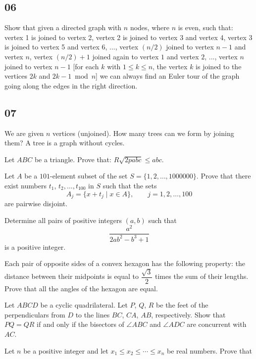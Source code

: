 \newpage
\subsection{06}
Show that given a directed graph with $n$ nodes, where $n$ is even, such that:
vertex 1 is joined to vertex 2, vertex 2 is joined to vertex 3 and vertex 4, vertex 3 is joined to vertex 5 and vertex 6, ..., vertex $(n/2)$ joined to vertex $n-1$ and vertex $n$, vertex $(n/2) +1$ joined again to vertex $1$ and vertex $2$, ..., vertex $n$ joined to vertex $n-1$
[for each $k$ with $1 \leq k \leq n$, the vertex $k$ is joined to the vertices $2k$ and $2k-1 \bmod n$]
we can always find an Euler tour of the graph going along the edges in the right direction.
\eq

\newpage
\subsection{07}
\bq{}{}
We are given $n$ vertices (unjoined). How many trees can we form by joining them? A tree is a graph without cycles.
\eq

\bq{}{}
Let $ABC$ be a triangle. Prove that:
$R \sqrt{2pabc} \leq abc$.
\eq

Let $A$ be a $101$-element subset of the set $S=\{1,2,\ldots,1000000\}$. Prove that there exist numbers $t_1$, $t_2, \ldots, t_{100}$ in $S$ such that the sets \[ A_j=\{x+t_j\mid x\in A\},\qquad j=1,2,\ldots,100 \] are pairwise disjoint.
\eq

Determine all pairs of positive integers $(a,b)$ such that \[ \dfrac{a^2}{2ab^2-b^3+1} \] is a positive integer.
\eq

Each pair of opposite sides of a convex hexagon has the following property: the distance between their midpoints is equal to $\dfrac{\sqrt{3}}{2}$ times the sum of their lengths. Prove that all the angles of the hexagon are equal.
\eq

Let $ABCD$ be a cyclic quadrilateral. Let $P$, $Q$, $R$ be the feet of the perpendiculars from $D$ to the lines $BC$, $CA$, $AB$, respectively. Show that $PQ=QR$ if and only if the bisectors of $\angle ABC$ and $\angle ADC$ are concurrent with $AC$.
\eq

Let $n$ be a positive integer and let $x_1\le x_2\le\cdots\le x_n$ be real numbers.
Prove that


